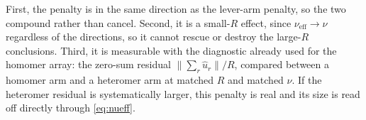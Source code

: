 \documentclass[11pt,a4paper]{article}
\newcommand{\uhat}{\hat{u}}
\begin{document}
First, the penalty is in the same direction as the lever-arm penalty, so the two compound
rather than cancel. Second, it is a small-$R$ effect, since
$\nu_{\mathrm{eff}}\to\nu$ regardless of the directions, so it cannot rescue or destroy
the large-$R$ conclusions. Third, it is measurable with the diagnostic already used for
the homomer array: the zero-sum residual $\|\sum_r\uhat_r\|/R$, compared between a homomer
arm and a heteromer arm at matched $R$ and matched $\nu$. If the heteromer residual is
systematically larger, this penalty is real and its size is read off directly through
\eqref{eq:nueff}.
\end{document}
